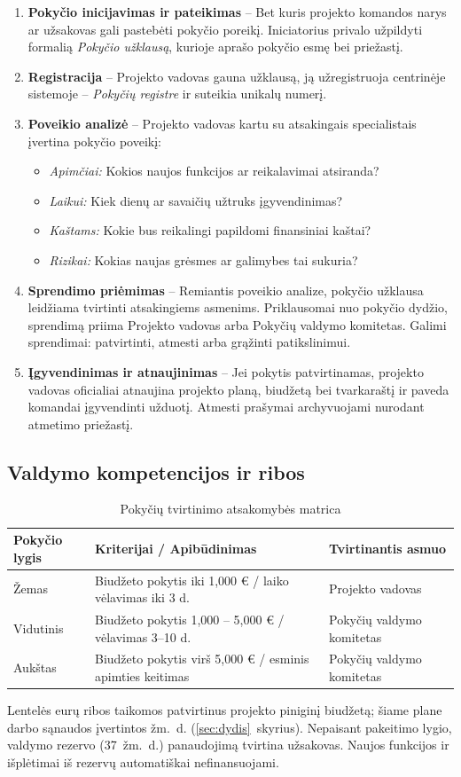 \begin{enumerate}
    \item \textbf{Pokyčio inicijavimas ir pateikimas} --
    Bet kuris projekto komandos narys ar užsakovas gali pastebėti pokyčio poreikį. Iniciatorius privalo užpildyti formalią \textit{Pokyčio užklausą}, kurioje aprašo pokyčio esmę bei priežastį.
    
    \item \textbf{Registracija} -- 
    Projekto vadovas gauna užklausą, ją užregistruoja centrinėje sistemoje -- \textit{Pokyčių registre} ir suteikia unikalų numerį.
    
    \item \textbf{Poveikio analizė} -- 
    Projekto vadovas kartu su atsakingais specialistais įvertina pokyčio poveikį:
    \begin{itemize}
        \item \textit{Apimčiai:} Kokios naujos funkcijos ar reikalavimai atsiranda?
        \item \textit{Laikui:} Kiek dienų ar savaičių užtruks įgyvendinimas?
        \item \textit{Kaštams:} Kokie bus reikalingi papildomi finansiniai kaštai?
        \item \textit{Rizikai:} Kokias naujas grėsmes ar galimybes tai sukuria?
    \end{itemize}
    
    \item \textbf{Sprendimo priėmimas} -- 
    Remiantis poveikio analize, pokyčio užklausa leidžiama tvirtinti atsakingiems asmenims. Priklausomai nuo pokyčio dydžio, sprendimą priima Projekto vadovas arba Pokyčių valdymo komitetas. Galimi sprendimai: patvirtinti, atmesti arba grąžinti patikslinimui.
    
    \item \textbf{Įgyvendinimas ir atnaujinimas} -- 
    Jei pokytis patvirtinamas, projekto vadovas oficialiai atnaujina projekto planą, biudžetą bei tvarkaraštį ir paveda komandai įgyvendinti užduotį. Atmesti prašymai archyvuojami nurodant atmetimo priežastį.
\end{enumerate}

\subsection{Valdymo kompetencijos ir ribos}
\begin{table}[htbp]
\centering
\caption{Pokyčių tvirtinimo atsakomybės matrica}
\label{tab:pokyciu_matrica}
\begin{tabularx}{\textwidth}{l X l}
\toprule
\textbf{Pokyčio lygis} & \textbf{Kriterijai / Apibūdinimas} & \textbf{Tvirtinantis asmuo} \\ 
\midrule
Žemas & Biudžeto pokytis iki 1,000 € / laiko vėlavimas iki 3 d. & Projekto vadovas \\
Vidutinis & Biudžeto pokytis 1,000 -- 5,000 € / vėlavimas 3--10 d. & Pokyčių valdymo komitetas \\
Aukštas & Biudžeto pokytis virš 5,000 € / esminis apimties keitimas & Pokyčių valdymo komitetas \\
\bottomrule
\end{tabularx}
\end{table}

Lentelės eurų ribos taikomos patvirtinus projekto piniginį biudžetą;
šiame plane darbo sąnaudos įvertintos žm.~d. (\ref{sec:dydis}~skyrius).
Nepaisant pakeitimo lygio, valdymo rezervo (37~žm.~d.) panaudojimą
tvirtina užsakovas. Naujos funkcijos ir išplėtimai iš rezervų
automatiškai nefinansuojami.
